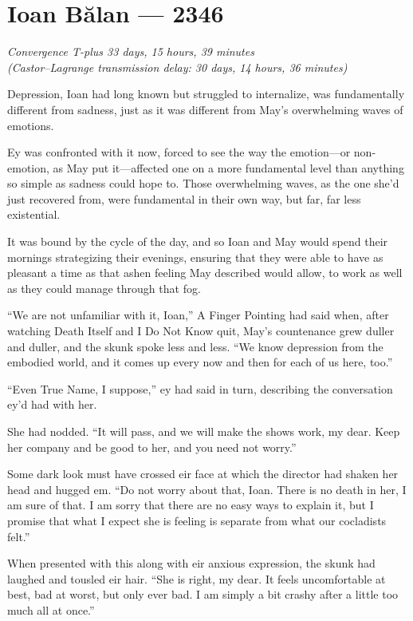\hypertarget{ioan-bux103lan-2346}{%
\chapter{Ioan Bălan — 2346}}

\begin{center}
\emph{Convergence T-plus 33 days, 15 hours, 39 minutes}\\
\emph{(Castor--Lagrange transmission delay: 30 days, 14 hours, 36 minutes)}
\end{center}

\noindent Depression, Ioan had long known but struggled to internalize, was fundamentally different from sadness, just as it was different from May's overwhelming waves of emotions.

Ey was confronted with it now, forced to see the way the emotion—or non-emotion, as May put it—affected one on a more fundamental level than anything so simple as sadness could hope to. Those overwhelming waves, as the one she'd just recovered from, were fundamental in their own way, but far, far less existential.

It was bound by the cycle of the day, and so Ioan and May would spend their mornings strategizing their evenings, ensuring that they were able to have as pleasant a time as that ashen feeling May described would allow, to work as well as they could manage through that fog.

``We are not unfamiliar with it, Ioan,'' A Finger Pointing had said when, after watching Death Itself and I Do Not Know quit, May's countenance grew duller and duller, and the skunk spoke less and less. ``We know depression from the embodied world, and it comes up every now and then for each of us here, too.''

``Even True Name, I suppose,'' ey had said in turn, describing the conversation ey'd had with her.

She had nodded. ``It will pass, and we will make the shows work, my dear. Keep her company and be good to her, and you need not worry.''

Some dark look must have crossed eir face at which the director had shaken her head and hugged em. ``Do not worry about that, Ioan. There is no death in her, I am sure of that. I am sorry that there are no easy ways to explain it, but I promise that what I expect she is feeling is separate from what our cocladists felt.''

When presented with this along with eir anxious expression, the skunk had laughed and tousled eir hair. ``She is right, my dear. It feels uncomfortable at best, bad at worst, but only ever bad. I am simply a bit crashy after a little too much all at once.''

